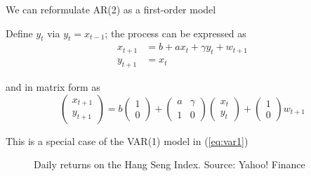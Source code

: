 %

\begin{frame}

    \vspace{2em}
    We can reformulate AR(2) as a first-order model 
    
    \vspace{1em}
    Define $y_t$ via $y_t = x_{t-1}$; the process can
    be expressed as
    \begin{align*}
        x_{t+1}  &= b + a x_t + \gamma y_t + w_{t+1}  \\
        y_{t+1}  &= x_t
    \end{align*}
    
    and in matrix form as
    \begin{equation*}
        \left( 
        \begin{array}{c}
            x_{t+1} \\
            y_{t+1} 
        \end{array}
        \right)
        = 
        b
        \left( 
        \begin{array}{c}
            1 \\
            0
        \end{array}
        \right)
        +
        \left( 
        \begin{array}{cc}
            a & \gamma \\
            1    & 0
        \end{array}
        \right)
        \left( 
        \begin{array}{c}
            x_t \\
            y_t 
        \end{array}
        \right)
        +
        \left( 
        \begin{array}{c}
            1 \\
            0
        \end{array}
        \right)
        w_{t+1}
    \end{equation*}
    
    This is a special case of the VAR(1) model in (\ref{eq:var1})
    
\end{frame}



\begin{frame}

    \vspace{2em}
    \vspace{10 mm}
    \begin{figure}
    \centering
    \caption{\label{f:hsi} Daily returns on the Hang Seng Index.  Source: Yahoo! Finance}
    
\end{figure}


\end{frame}

